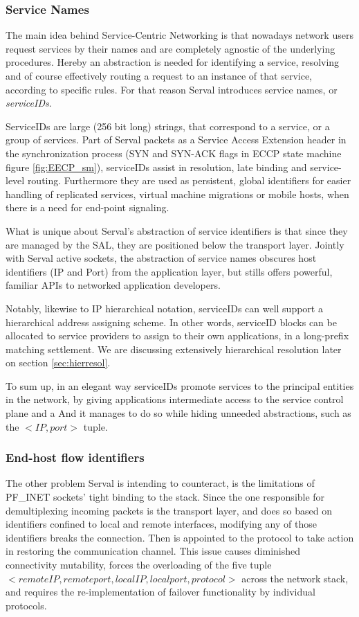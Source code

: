 \subsubsection{Service Names}
The main idea behind Service-Centric Networking is that nowadays network users request services by their names and are completely agnostic of the underlying procedures.
Hereby an abstraction is needed for identifying a service, resolving and of course effectively routing a request to an instance of that service, according to specific rules.
For that reason Serval introduces service names, or \emph{serviceIDs}.

ServiceIDs are large (256 bit long) strings, that correspond to a service, or a group of services.
Part of Serval packets as a Service Access Extension header in the synchronization process (SYN and SYN-ACK flags in ECCP state machine figure \ref{fig:EECP_sm}), serviceIDs assist in resolution, late binding and service-level routing.
Furthermore they are used as persistent, global identifiers for easier handling of replicated services, virtual machine migrations or mobile hosts, when there is a need for end-point signaling.

What is unique about Serval's abstraction of service identifiers is that since they are managed by the SAL, they are positioned below the transport layer.
Jointly with Serval active sockets, the abstraction of service names obscures host identifiers (IP and Port) from the application layer, but stills offers powerful, familiar APIs to networked application developers.

Notably, likewise to IP hierarchical notation, serviceIDs can well support a hierarchical address assigning scheme.
In other words, serviceID blocks can be allocated to service providers to assign to their own applications, in a long-prefix matching settlement.
We are discussing extensively hierarchical resolution later on section \ref{sec:hierresol}.

To sum up, in an elegant way serviceIDs promote services to the principal entities in the network, by giving applications intermediate access to the service control plane and a
And it manages to do so while hiding unneeded abstractions, such as the $<IP, port>$ tuple.



\subsubsection{End-host flow identifiers}
The other problem Serval is intending to counteract, is the limitations of PF\_INET sockets' tight binding to the stack.
Since the one responsible for demultiplexing incoming packets is the transport layer, and does so based on identifiers confined to local and remote interfaces, modifying any of those identifiers breaks the connection.
Then is appointed to the protocol to take action in restoring the communication channel.
This issue causes diminished connectivity mutability, forces the overloading of the five tuple $<remote IP, remote port, local IP, local port, protocol>$ across the network stack, and requires the re-implementation of failover functionality by individual protocols.

